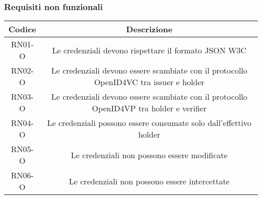 \subsubsection*{Requisiti non funzionali}
    \begin{longtable}{|c|c|}
        \hline
        \textbf{Codice} & \textbf{Descrizione} \\
        \hline
        RN01-O & Le credenziali devono rispettare il formato JSON W3C\\
        RN02-O & Le credenziali devono essere scambiate con il protocollo OpenID4VC tra issuer e holder\\
        RN03-O & Le credenziali devono essere scambiate con il protocollo OpenID4VP tra holder e verifier\\
        RN04-O & Le credenziali possono essere consumate solo dall'effettivo holder\\
        RN05-O & Le credenziali non possono essere modificate\\
        RN06-O & Le credenziali non possono essere intercettate\\
        \hline
    \end{longtable}